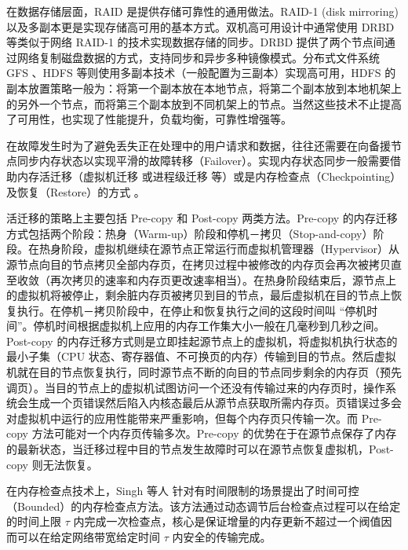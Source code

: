 在数据存储层面，RAID \cite{Patterson:1988:CRA:50202.50214} 是提供存储可靠性的通用做法。RAID-1 (disk mirroring) 以及多副本更是实现存储高可用的基本方式。双机高可用设计中通常使用 DRBD \cite{DRBD:2015} 等类似于网络 RAID-1 的技术实现数据存储的同步。DRBD 提供了两个节点间通过网络复制磁盘数据的方式，支持同步和异步多种镜像模式。分布式文件系统 GFS \cite{Ghemawat:2003:GFS:945445.945450}、HDFS \cite{Hadoop} 等则使用多副本技术（一般配置为三副本）实现高可用，HDFS 的副本放置策略一般为：将第一个副本放在本地节点，将第二个副本放到本地机架上的另外一个节点，而将第三个副本放到不同机架上的节点。当然这些技术不止提高了可用性，也实现了性能提升，负载均衡，可靠性增强等。

在故障发生时为了避免丢失正在处理中的用户请求和数据，往往还需要在向备援节点同步内存状态以实现平滑的故障转移（Failover）。实现内存状态同步一般需要借助内存活迁移（虚拟机迁移 \cite{Clark:2005:LMV:1251203.1251223} 或进程级迁移 \cite{Wang:2008:PPL:1413370.1413414} 等）或是内存检查点（Checkpointing）及恢复（Restore）的方式 \cite{Duell03thedesign, CRIU:2016}。

活迁移的策略上主要包括 Pre-copy 和 Post-copy 两类方法。Pre-copy 的内存迁移方式包括两个阶段：热身（Warm-up）阶段和停机－拷贝（Stop-and-copy）阶段。在热身阶段，虚拟机继续在源节点正常运行而虚拟机管理器（Hypervisor）从源节点向目的节点拷贝全部内存页，在拷贝过程中被修改的内存页会再次被拷贝直至收敛（再次拷贝的速率和内存页更改速率相当）。在热身阶段结束后，源节点上的虚拟机将被停止，剩余脏内存页被拷贝到目的节点，最后虚拟机在目的节点上恢复执行。在停机－拷贝阶段中，在停止和恢复执行之间的这段时间叫 ``停机时间''。停机时间根据虚拟机上应用的内存工作集大小一般在几毫秒到几秒之间。Post-copy 的内存迁移方式则是立即挂起源节点上的虚拟机，将虚拟机执行状态的最小子集（CPU 状态、寄存器值、不可换页的内存）传输到目的节点。然后虚拟机就在目的节点恢复执行，同时源节点不断的向目的节点同步剩余的内存页（预先调页）。当目的节点上的虚拟机试图访问一个还没有传输过来的内存页时，操作系统会生成一个页错误然后陷入内核态最后从源节点获取所需内存页。页错误过多会对虚拟机中运行的应用性能带来严重影响，但每个内存页只传输一次。而 Pre-copy 方法可能对一个内存页传输多次。Pre-copy 的优势在于在源节点保存了内存的最新状态，当迁移过程中目的节点发生故障时可以在源节点恢复虚拟机，Post-copy 则无法恢复。

在内存检查点技术上，Singh 等人 \cite{Singh:2013:YEG:2482626.2482642} 针对有时间限制的场景提出了时间可控（Bounded）的内存检查点方法。该方法通过动态调节后台检查点过程可以在给定的时间上限 $\tau$ 内完成一次检查点，核心是保证增量的内存更新不超过一个阀值因而可以在给定网络带宽给定时间 $\tau$ 内安全的传输完成。

